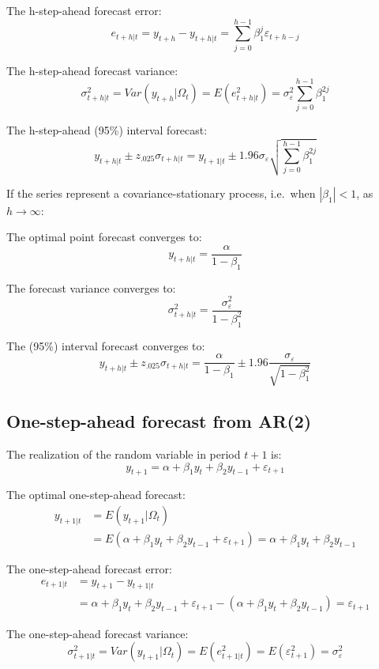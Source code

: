 \documentclass[
  oneside]{book}
\begin{document}
The h-step-ahead forecast error: \[e_{t+h|t} = y_{t+h} - y_{t+h|t} = \textstyle\sum_{j=0}^{h-1}\beta_1^j\varepsilon_{t+h-j}\]

The h-step-ahead forecast variance: \[\sigma_{t+h|t}^2 = Var(y_{t+h}|\Omega_t) = E(e_{t+h|t}^2) = \sigma_{\varepsilon}^2\textstyle\sum_{j=0}^{h-1}\beta_1^{2j}\]

The h-step-ahead (95\%) interval forecast: \[y_{t+h|t} \pm z_{.025}\sigma_{t+h|t} = y_{t+1|t} \pm 1.96\sigma_{\varepsilon}\sqrt{\textstyle\sum_{j=0}^{h-1}\beta_1^{2j}}\]

If the series represent a covariance-stationary process, i.e.~when \(|\beta_1| < 1\), as \(h \to \infty\):

The optimal point forecast converges to: \[y_{t+h|t} = \frac{\alpha}{1-\beta_1}\]

The forecast variance converges to: \[\sigma_{t+h|t}^2 = \frac{\sigma_{\varepsilon}^2}{1-\beta_1^2}\]

The (95\%) interval forecast converges to: \[y_{t+h|t} \pm z_{.025}\sigma_{t+h|t} = \frac{\alpha}{1-\beta_1} \pm 1.96\frac{\sigma_{\varepsilon}}{\sqrt{1-\beta_1^2}}\]

\hypertarget{one-step-ahead-forecast-from-ar2}{%
\subsection{One-step-ahead forecast from AR(2)}\label{one-step-ahead-forecast-from-ar2}}

The realization of the random variable in period \(t+1\) is: \[y_{t+1} = \alpha + \beta_1 y_{t} + \beta_2 y_{t-1} + \varepsilon_{t+1}\]

The optimal one-step-ahead forecast:
\[\begin{aligned}
y_{t+1|t} &= E(y_{t+1}|\Omega_t) \\
&= E(\alpha + \beta_1 y_{t} + \beta_2 y_{t-1} + \varepsilon_{t+1}) = \alpha + \beta_1 y_{t} + \beta_2 y_{t-1}
\end{aligned}\]

The one-step-ahead forecast error:
\[\begin{aligned}
e_{t+1|t} &= y_{t+1} - y_{t+1|t} \\
&= \alpha + \beta_1 y_t + \beta_2 y_{t-1} + \varepsilon_{t+1} - (\alpha + \beta_1 y_t + \beta_2 y_{t-1}) = \varepsilon_{t+1}
\end{aligned}\]

The one-step-ahead forecast variance: \[\sigma_{t+1|t}^2 = Var(y_{t+1}|\Omega_t) = E(e_{t+1|t}^2) = E(\varepsilon_{t+1}^2) = \sigma_{\varepsilon}^2\]
\end{document}
